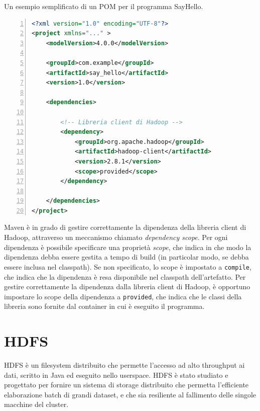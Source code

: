 \documentclass[italian,a4paper, twoside, 12pt]{report}
\begin{document}
\begin{codelisting}

\caption{Un esempio semplificato di un POM per il programma SayHello.}

\begin{lstlisting}[language=XML, numbers=left, label=lst:pom_example]
<?xml version="1.0" encoding="UTF-8"?>
<project xmlns="..." >
    <modelVersion>4.0.0</modelVersion>

    <groupId>com.example</groupId>
    <artifactId>say_hello</artifactId>
    <version>1.0</version>

    <dependencies>

        <!-- Libreria client di Hadoop -->
        <dependency>
            <groupId>org.apache.hadoop</groupId>
            <artifactId>hadoop-client</artifactId>
            <version>2.8.1</version>
            <scope>provided</scope>
        </dependency>

    </dependencies>
</project>
\end{lstlisting}

\end{codelisting}

Maven è in grado di gestire correttamente la dipendenza della libreria
client di Hadoop, attraverso un meccanismo chiamato \emph{dependency
scope}. Per ogni dipendenza è possibile specificare una proprietà
\emph{scope}, che indica in che modo la dipendenza debba essere gestita
a tempo di build (in particolar modo, se debba essere inclusa nel
classpath). Se non specificato, lo scope è impostato a
\lstinline!compile!, che indica che la dipendenza è resa disponibile nel
classpath dell'artefatto. Per gestire correttamente la dipendenza dalla
libreria client di Hadoop, è opportuno impostare lo scope della
dipendenza a \lstinline!provided!, che indica che le classi della
libreria sono fornite dal container in cui è eseguito il programma.

\section{HDFS}\label{hdfs}

HDFS è un filesystem distribuito che permette l'accesso ad alto
throughput ai dati, scritto in Java ed eseguito nello userspace. HDFS è
stato studiato e progettato per fornire un sistema di storage
distribuito che permetta l'efficiente elaborazione batch di grandi
dataset, e che sia resiliente al fallimento delle singole macchine del
cluster.
\end{document}
